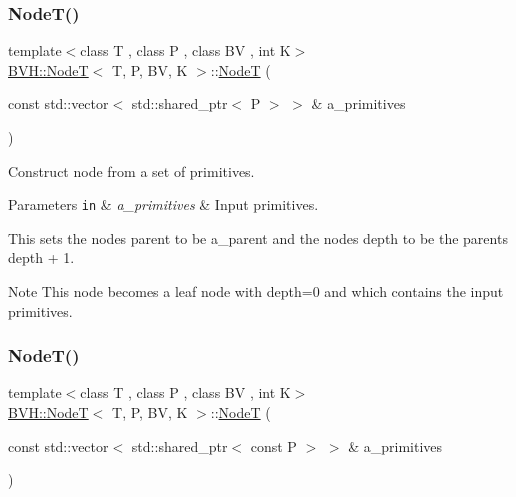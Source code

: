 \subsubsection{\texorpdfstring{Node\+T()}{NodeT()}\hspace{0.1cm}{\footnotesize\ttfamily [2/3]}}
{\footnotesize\ttfamily template$<$class T , class P , class BV , int K$>$ \\
\hyperlink{classBVH_1_1NodeT}{B\+V\+H\+::\+NodeT}$<$ T, P, BV, K $>$\+::\hyperlink{classBVH_1_1NodeT}{NodeT} (\begin{DoxyParamCaption}\item[{const std\+::vector$<$ std\+::shared\+\_\+ptr$<$ P $>$ $>$ \&}]{a\+\_\+primitives }\end{DoxyParamCaption})\hspace{0.3cm}{\ttfamily [inline]}}



Construct node from a set of primitives. 


\begin{DoxyParams}[1]{Parameters}
\mbox{\tt in}  & {\em a\+\_\+primitives} & Input primitives.\\
\hline
\end{DoxyParams}
This sets the node\textquotesingle{}s parent to be a\+\_\+parent and the node\textquotesingle{}s depth to be the parent\textquotesingle{}s depth + 1. \begin{DoxyNote}{Note}
This node becomes a leaf node with depth=0 and which contains the input primitives. 
\end{DoxyNote}
\mbox{\label{classBVH_1_1NodeT_a6312ce04f70c2e1a860ce380298909b6}} 
\subsubsection{\texorpdfstring{Node\+T()}{NodeT()}\hspace{0.1cm}{\footnotesize\ttfamily [3/3]}}
{\footnotesize\ttfamily template$<$class T , class P , class BV , int K$>$ \\
\hyperlink{classBVH_1_1NodeT}{B\+V\+H\+::\+NodeT}$<$ T, P, BV, K $>$\+::\hyperlink{classBVH_1_1NodeT}{NodeT} (\begin{DoxyParamCaption}\item[{const std\+::vector$<$ std\+::shared\+\_\+ptr$<$ const P $>$ $>$ \&}]{a\+\_\+primitives }\end{DoxyParamCaption})\hspace{0.3cm}{\ttfamily [inline]}}



